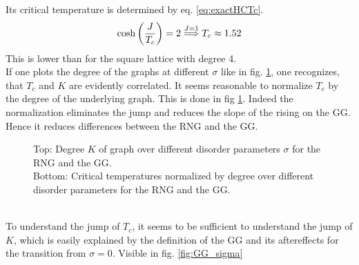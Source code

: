     Its critical temperature is determined by eq. \eqref{eq:exactHCTc}.
    \begin{equation}
        \cosh\left(\frac{J}{T_c}\right)=2 \overset{J=1}{\Longrightarrow} T_c \approx 1.52
        \label{eq:exactHCTc}
    \end{equation}
    This is lower than for the square lattice with degree 4.\\
    If one plots the degree of the graphs at different \(\sigma\) like
    in fig. \ref{fig:Tc_deg},
    one recognizes, that \(T_c\) and \(K\) are evidently correlated.
    It seems reasonable to normalize \(T_c\) by the degree of the underlying
    graph. This is done in fig \ref{fig:Tc_deg}.
    Indeed the normalization eliminates the jump and reduces the
    slope of the rising on the GG. Hence it reduces differences
    between the RNG and the GG.
    \begin{figure}[htbp]
        \centering


        \caption[Critical Temperature normalized by Degree of the Graph]
        {
            Top: Degree \(K\) of graph over different
            disorder parameters \(\sigma\) for
             the RNG and
             the GG.\\
            Bottom: Critical temperatures normalized by degree over different
            disorder parameters for
             the RNG and
             the GG.
        }
        \label{fig:Tc_deg}
    \end{figure}\\
    To understand the jump of \(T_c\), it seems to be sufficient to
    understand the jump of \(K\), which is easily explained
    by the definition of the GG and its aftereffects for
    the transition from \(\sigma = 0\). Visible in fig. \ref{fig:GG_sigma}
